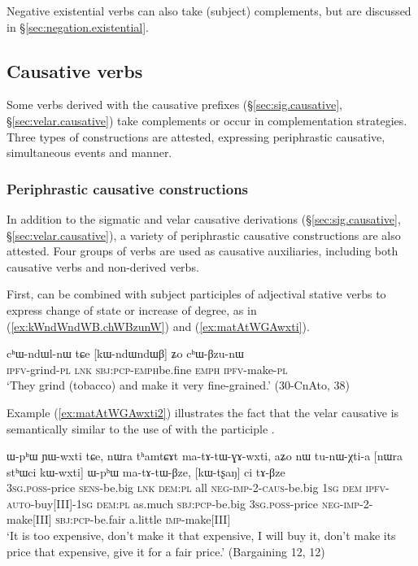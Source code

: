 Negative existential verbs can also take (subject) complements, but are discussed in §\ref{sec:negation.existential}. 

\subsection{Causative verbs}
Some verbs derived with the causative prefixes (§\ref{sec:sig.causative}, §\ref{sec:velar.causative}) take complements or occur in complementation strategies. Three types of constructions are attested, expressing periphrastic causative, simultaneous events and manner.

\subsubsection{Periphrastic causative constructions} \label{sec:sWpa.sABzu}
In addition to the sigmatic and velar causative derivations (§\ref{sec:sig.causative}, §\ref{sec:velar.causative}), a variety of periphrastic causative constructions are also attested. Four groups of verbs are used as causative auxiliaries, including both causative verbs and non-derived verbs.

First,  can be combined with subject participles of adjectival stative verbs to express change of state or increase of degree, as in (\ref{ex:kWndWndWB.chWBzunW}) and (\ref{ex:matAtWGAwxti}).

\begin{exe}
\ex  \label{ex:kWndWndWB.chWBzunW}
\gll cʰɯ-ndɯl-nɯ tɕe [kɯ-ndɯ\redp{}ndɯβ] ʑo cʰɯ-βzu-nɯ \\
\textsc{ipfv}-grind-\textsc{pl} \textsc{lnk} \textsc{sbj}:\textsc{pcp}-\textsc{emph}\redp{}be.fine \textsc{emph} \textsc{ipfv}-make-\textsc{pl} \\
\glt `They grind (tobacco) and make it very fine-grained.' (30-CnAto, 38)
\end{exe}

Example (\ref{ex:matAtWGAwxti2}) illustrates the fact that the velar causative  is semantically similar to the use of  with the participle .

\begin{exe}
\ex  \label{ex:matAtWGAwxti2}
\gll  ɯ-pʰɯ ɲɯ-wxti tɕe, nɯra tʰamtɕɤt ma-tɤ-tɯ-ɣɤ-wxti, aʑo nɯ tu-nɯ-χti-a [nɯra stʰɯci kɯ-wxti] ɯ-pʰɯ ma-tɤ-tɯ-βze, [kɯ-tʂaŋ] ci tɤ-βze \\
   \textsc{3sg}.\textsc{poss}-price \textsc{sens}-be.big \textsc{lnk} \textsc{dem}:\textsc{pl} all \textsc{neg}-\textsc{imp}-2-\textsc{caus}-be.big \textsc{1sg} \textsc{dem} \textsc{ipfv}-\textsc{auto}-buy[III]-\textsc{1sg}   \textsc{dem}:\textsc{pl} as.much \textsc{sbj}:\textsc{pcp}-be.big \textsc{3sg}.\textsc{poss}-price \textsc{neg}-\textsc{imp}-2-make[III] \textsc{sbj}:\textsc{pcp}-be.fair a.little \textsc{imp}-make[III] \\
\glt `It is too expensive, don't make it that expensive, I will buy it, don't make its price that expensive, give it for a fair price.' (Bargaining 12,  12)
\end{exe}

